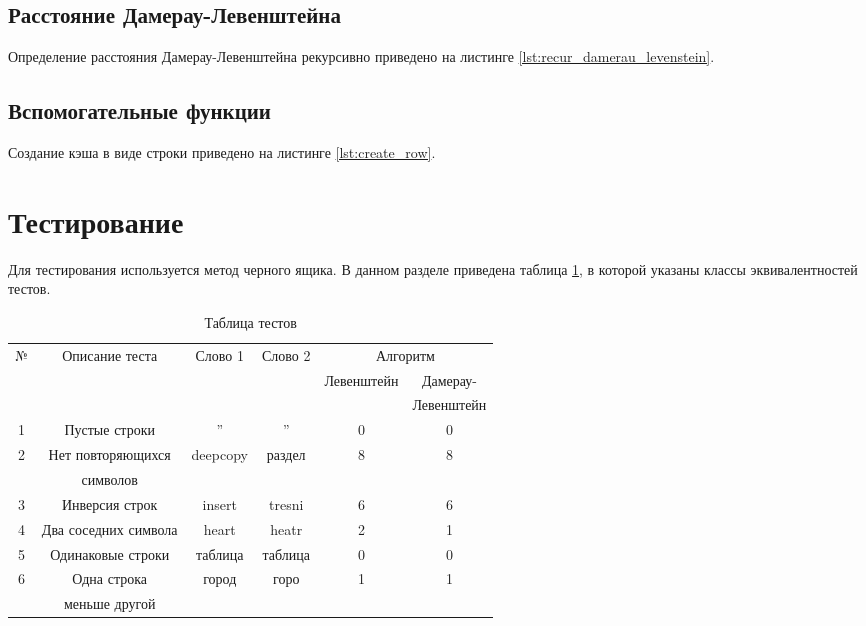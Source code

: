 \subsection{Расстояние Дамерау-Левенштейна}
Определение расстояния Дамерау-Левенштейна рекурсивно приведено на листинге \ref{lst:recur_damerau_levenstein}.



\subsection{Вспомогательные функции}
Создание кэша в виде строки приведено на листинге \ref{lst:create_row}.


\section{Тестирование}
Для тестирования используется метод черного ящика. В данном разделе приведена таблица \ref{table:ref1}, в которой указаны классы эквивалентностей тестов. \\

\begin{table}[H]
	\centering
	\captionsetup{singlelinecheck = false, justification=raggedleft}
	\caption{Таблица тестов}
	\label{table:ref1}
	\begin{tabular}{|c|c|c|c|c|c|}
		\hline
		\multirow{3}{*}{№} & \multirow{3}{*}{Описание теста} & \multirow{3}{*}{Слово 1}  &  \multirow{3}{*}{Слово 2}   & \multicolumn{2}{|c|}{Алгоритм}\\ \cline{5-6}
		&                &          &            &\multirow{2}{*}{Левенштейн}   &Дамерау-	\\ 
		&                &          &            &             &Левенштейн       	        \\ \hline
		1& Пустые строки  &  ''      &    ''      &   0         &  0 						\\ \hline
		\multirow{2}{*}{2}& Нет повторяющихся & \multirow{2}{*}{deepcopy} & \multirow{2}{*}{раздел} & \multirow{2}{*}{8}   &  \multirow{2}{*}{8}                      
		\\
		& символов        &          &            &             &
		\\ \hline
		3& Инверсия строк & insert   &tresni      &   6         &  6                       \\ \hline
		4& Два соседних символа       & heart    & heatr  & 2   &  1                       \\ \hline
		5& Одинаковые строки          & таблица  & таблица& 0   &  0						\\ \hline
		\multirow{2}{*}{6}& Одна строка &\multirow{2}{*}{город} &\multirow{2}{*}{горо} & \multirow{2}{*}{1} & \multirow{2}{*}{1} \\  
		& меньше другой   &           &           &      &\\ \hline
	\end{tabular}
\end{table}
